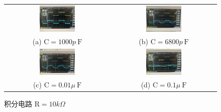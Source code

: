 \documentclass{article}
\begin{document}
\begin{figure}[h]
    \centering
    \begin{tabular}{cc}
        \includegraphics[width=0.35\textwidth]{0.1.jpg} &
        \includegraphics[width=0.35\textwidth]{0.01.jpg} \\
        (a) $\mathrm{C}=1000p \mathrm{~F}$& (b) $\mathrm{C}=6800p \mathrm{~F}$ \\
        \includegraphics[width=0.35\textwidth]{6800.jpg} &
        \includegraphics[width=0.35\textwidth]{1000.jpg} \\
        (c) $\mathrm{C}=0.01 \mu \mathrm{~F}$ & (d) $\mathrm{C}=0.1 \mu \mathrm{~F}$ \\
    \end{tabular}
    \caption{积分电路  $\mathrm{R}=10k \Omega $}
    \label{fig:grouped_images}
\end{figure}
\end{document}
